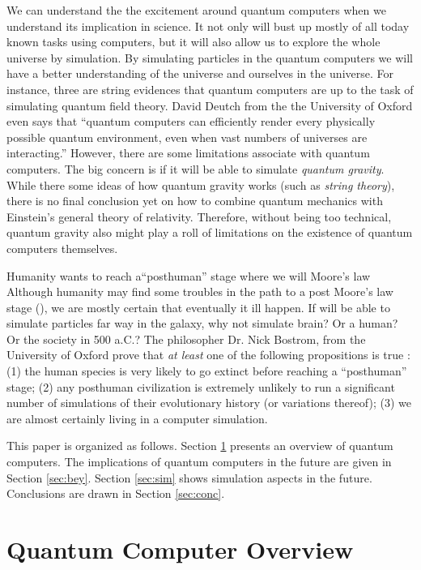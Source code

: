 \documentclass[twoside,11pt]{article}
\begin{document}
We can understand the the excitement around quantum computers when we understand its implication in science.
It not only will bust up mostly of all today known tasks using computers, but it will also allow us to explore the whole universe by simulation.
By simulating particles in the quantum computers we will have a better understanding of the universe and ourselves in the universe.
For instance, three are string evidences that quantum computers are up to the task of simulating quantum field theory.
David Deutch from the the University of Oxford even says that ``quantum computers can efficiently render every physically possible quantum environment, even when vast numbers of universes are interacting.''
However, there are some limitations associate with quantum computers.
The big concern is if it will be able to simulate \emph{quantum gravity}.
While there some ideas of how quantum gravity works (such as \emph{string theory}), there is no final conclusion yet on how to combine quantum mechanics with Einstein’s general theory of relativity.
Therefore, without being too technical, quantum gravity also might play a roll of limitations on the existence of quantum computers themselves.

Humanity wants to reach a``posthuman'' stage where we will Moore's law
Although humanity may find some troubles in the path to a post Moore's law stage (), we are mostly certain that eventually it ill happen.
If will be able to simulate particles far way in the galaxy, why not simulate brain? Or a human? Or the society in 500 a.C.?
The philosopher Dr. Nick Bostrom, from the University of Oxford prove that \emph{at least} one of the following propositions is true \citep{bostrom2003we}:
(1) the human species is very likely to go extinct before reaching a ``posthuman'' stage; 
(2) any posthuman civilization is extremely unlikely to run a significant number of simulations of their evolutionary history (or variations thereof); 
(3) we are almost certainly living in a computer simulation. 


This paper is organized as follows.
Section \ref{sec:qc} presents an overview of quantum computers.
The implications of quantum computers in the future are given in Section \ref{sec:bey}.
Section \ref{sec:sim} shows simulation aspects in the future.
Conclusions are drawn in Section \ref{sec:conc}.

\section{Quantum Computer Overview}
\label{sec:qc}
\end{document}
